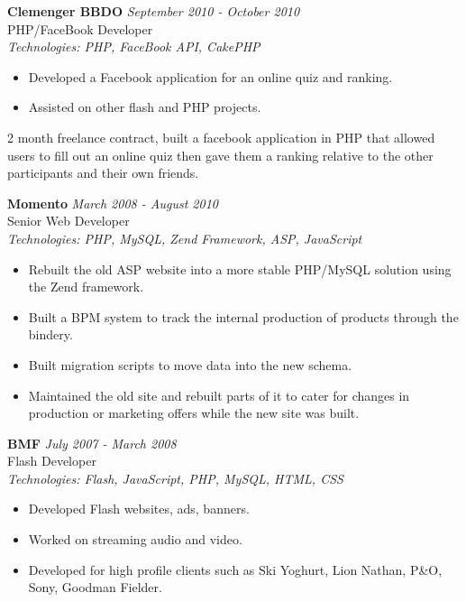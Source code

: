 \documentclass[a4paper,10pt]{article}
\begin{document}
\textbf{Clemenger BBDO} \hfill \textit{September 2010 - October 2010} \\
PHP/FaceBook Developer \\
\textit{Technologies: PHP, FaceBook API, CakePHP}
\begin{itemize}
    \item Developed a Facebook application for an online quiz and ranking.
    \item Assisted on other flash and PHP projects.
\end{itemize}

2 month freelance contract, built a facebook application in PHP that allowed users to fill out an online quiz then gave 
them a ranking relative to the other participants and their own friends.

\vspace{1em}

\textbf{Momento} \hfill \textit{March 2008 - August 2010} \\
Senior Web Developer \\
\textit{Technologies: PHP, MySQL, Zend Framework, ASP, JavaScript}
\begin{itemize}
    \item Rebuilt the old ASP website into a more stable PHP/MySQL solution using the Zend framework.
    \item Built a BPM system to track the internal production of products through the bindery.
    \item Built migration scripts to move data into the new schema.
    \item Maintained the old site and rebuilt parts of it to cater for changes in production or marketing offers while the new site was built.
\end{itemize}

\vspace{1em}

\textbf{BMF} \hfill \textit{July 2007 - March 2008} \\
Flash Developer \\
\textit{Technologies: Flash, JavaScript, PHP, MySQL, HTML, CSS}
\begin{itemize}
    \item Developed Flash websites, ads, banners.
    \item Worked on streaming audio and video.
    \item Developed for high profile clients such as Ski Yoghurt, Lion Nathan, P\&O, Sony, Goodman Fielder.
\end{itemize}
\end{document}
